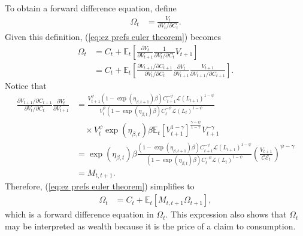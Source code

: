 \documentclass[12 pt, oneside]{article}
\theoremstyle{definition}
\theoremstyle{definition}
\theoremstyle{definition}
\newcommand{\E}{\mathbb{E}}
\newcommand{\calC}{\mathcal{C}}
\newcommand{\calE}{\mathcal{E}}
\newcommand{\calL}{\mathcal{L}}
\begin{document}
To obtain a forward difference equation, define
\begin{align}
  \Omega_t & = \frac{V_t}{\partial V_t /\partial C_t}.
\end{align}
Given this definition, (\ref{eq:ez prefs euler theorem}) becomes
\begin{align*}
  \Omega_t & = C_t + \E_t\left[\frac{\partial V_t}{\partial V_{t + 1}}\frac{1}{\partial V_t / \partial C_t}V_{t + 1}\right]\\
  & = C_t + \E_t\left[\frac{\partial V_{t + 1} / \partial C_{t + 1}}{\partial V_t / \partial C_t}\frac{\partial V_t}{\partial V_{t + 1}}\frac{V_{t + 1}}{\partial V_{t + 1} / \partial C_{t + 1}}\right].
\end{align*}
Notice that
\begin{align*}
  \frac{\partial V_{t + 1} / \partial C_{t + 1}}{\partial V_t / \partial C_t} \frac{\partial V_t}{\partial V_{t + 1}} & = \frac{V_{t + 1}^\psi (1 - \exp(\eta_{\beta, t + 1})\beta)C_{t + 1}^{ - \psi}\calL(L_{t + 1})^{1 - \psi}}{V_t^\psi(1 - \exp(\eta_{\beta, t})\beta) C_t^{-\psi}\calL(L_t)^{1 - \psi}} \\
                                                                                                                      &\quad \times V_t^\psi\exp(\eta_{\beta, t})\beta \E_t[V_{t + 1}^{1 - \gamma}]^{\frac{\gamma - \psi}{1 - \gamma}}V_{t + 1}^{ - \gamma}\\
                                                                                                                      & = \exp(\eta_{\beta, t})\beta\frac{ (1 - \exp(\eta_{\beta, t + 1})\beta)C_{t + 1}^{ - \psi}\calL(L_{t + 1})^{1 - \psi}}{(1 - \exp(\eta_{\beta, t})\beta) C_t^{-\psi}\calL(L_t)^{1 - \psi}}\left(\frac{V_{t + 1}}{\calC\calE_t}\right)^{\psi - \gamma}\\
                                                                                                                      & = M_{t, t + 1}.
\end{align*}
Therefore, (\ref{eq:ez prefs euler theorem}) simplifies to
\begin{align}\label{eq:ez prefs euler theorem forward difference}
  \Omega_t & = C_t + \E_t[M_{t, t + 1} \Omega_{t + 1}],
\end{align}
which is a forward difference equation in $\Omega_t$. This expression also shows that $\Omega_t$ may be interpreted as wealth because it is the price of a claim to consumption.
\end{document}
